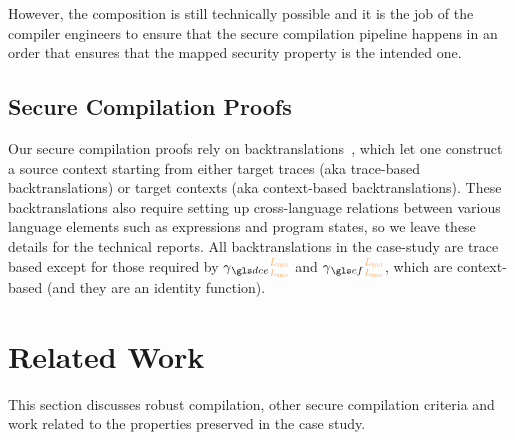 \documentclass[acmsmall]{acmart}
\theoremstyle{definition}
\begin{document}
However, the composition is still technically possible and it is the job of the compiler engineers to ensure that the secure compilation pipeline happens in an order that ensures that the mapped security property is the intended one.

\subsection{Secure Compilation Proofs}\label{subsec:seccompproofs}

Our secure compilation proofs rely on backtranslations~\cite{abate2019jour,patrignani2021rsc}, which let one construct a source context starting from either target traces (aka trace-based backtranslations) or target contexts (aka context-based backtranslations).
These backtranslations also require setting up cross-language relations between various language elements such as expressions and program states, so we leave these details for the technical reports.
All backtranslations in the case-study are trace based except for those required by $\ccdce$ and $\cccf$, which are context-based (and they are an identity function). 

\section{Related Work}\label{sec:relwork}

This section discusses robust compilation, other secure compilation criteria and work related to the properties preserved in the case study.
\end{document}
